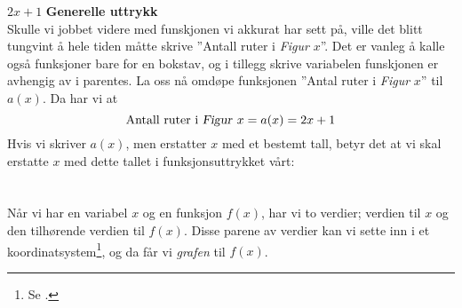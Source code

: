 \st{$ {2x+1} $}
\newpage
\textbf{Generelle uttrykk} \\
Skulle vi jobbet videre med funskjonen vi akkurat har sett på, ville det blitt tungvint å hele tiden måtte skrive ''Antall ruter i \textsl{Figur }$ x $''. Det er vanleg å kalle også funksjoner bare for en bokstav, og i tillegg skrive variabelen funskjonen er avhengig av i parentes. La oss nå omdøpe funksjonen ''Antal ruter i \textsl{Figur} $ x $'' til $ a(x) $. Da har vi at
\[ \text{Antall ruter i \textsl{Figur }}x=a(x)=2x+1 \]
Hvis vi skriver $ a(x) $, men erstatter $ x $ med et bestemt tall, betyr det at vi skal erstatte $ x $ med dette tallet i funksjonsuttrykket vårt:
\newpage
{}
\section{\lingraf}
Når vi har en variabel $ x $ og en funksjon $ f(x) $, har vi to verdier; verdien til $ x $ og den tilhørende verdien til $ f(x) $. Disse parene av verdier kan vi sette inn i et koordinatsystem\footnote{Se .}, og da får vi \textit{grafen} til $ f(x) $. \vsk

